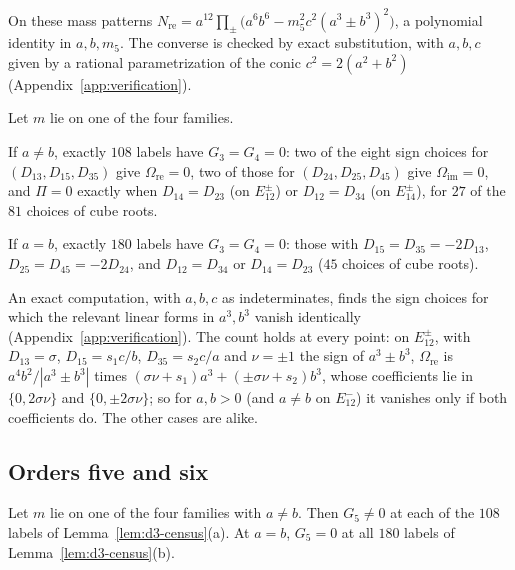 On these mass patterns $N_{\mathrm{re}}=a^{12}\prod_\pm\bigl(a^6b^6-m_5^2c^2(a^3\pm b^3)^2\bigr)$,
a polynomial identity in $a,b,m_5$.  The converse is checked by exact substitution, with $a,b,c$
given by a rational parametrization of the conic $c^2=2(a^2+b^2)$
(Appendix~\ref{app:verification}).

\begin{lemma}\label{lem:d3-census}
Let $m$ lie on one of the four families.
\begin{alphalist}
  \item If $a\ne b$, exactly $108$ labels have $G_3=G_4=0$: two of the eight sign choices for
  $(D_{13},D_{15},D_{35})$ give $\Omega_{\mathrm{re}}=0$, two of those for $(D_{24},D_{25},D_{45})$
  give $\Omega_{\mathrm{im}}=0$, and $\Pi=0$ exactly when $D_{14}=D_{23}$ (on $E^\pm_{12}$) or
  $D_{12}=D_{34}$ (on $E^\pm_{14}$), for $27$ of the $81$ choices of cube roots.
  \item If $a=b$, exactly $180$ labels have $G_3=G_4=0$: those with $D_{15}=D_{35}=-2D_{13}$,
  $D_{25}=D_{45}=-2D_{24}$, and $D_{12}=D_{34}$ or $D_{14}=D_{23}$ ($45$ choices of cube roots).
\end{alphalist}
\end{lemma}

An exact computation, with $a,b,c$ as indeterminates, finds the sign choices for which the
relevant linear forms in $a^3,b^3$ vanish identically (Appendix~\ref{app:verification}).  The
count holds at every point: on $E^\pm_{12}$, with $D_{13}=\sigma$, $D_{15}=s_1c/b$,
$D_{35}=s_2c/a$ and $\nu=\pm1$ the sign of $a^3\pm b^3$, $\Omega_{\mathrm{re}}$ is
$a^4b^2/|a^3\pm b^3|$ times $(\sigma\nu+s_1)a^3+(\pm\sigma\nu+s_2)b^3$, whose coefficients lie in
$\{0,2\sigma\nu\}$
and $\{0,\pm2\sigma\nu\}$; so for $a,b>0$ (and $a\ne b$ on $E^-_{12}$) it vanishes only if both
coefficients do.  The other cases are alike.

\subsection{Orders five and six}

\begin{lemma}\label{lem:d3-order5}
Let $m$ lie on one of the four families with $a\ne b$.  Then $G_5\neq0$ at each of the $108$
labels of Lemma~\ref{lem:d3-census}(a).  At $a=b$, $G_5=0$ at all $180$ labels of
Lemma~\ref{lem:d3-census}(b).
\end{lemma}

